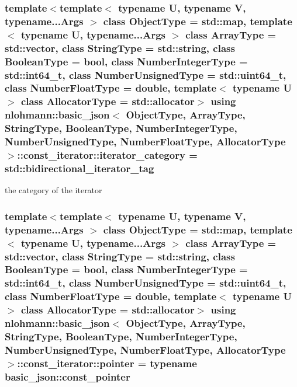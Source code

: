 \subsubsection[{\texorpdfstring{iterator\+\_\+category}{iterator_category}}]{\setlength{\rightskip}{0pt plus 5cm}template$<$template$<$ typename U, typename V, typename...\+Args $>$ class Object\+Type = std\+::map, template$<$ typename U, typename...\+Args $>$ class Array\+Type = std\+::vector, class String\+Type  = std\+::string, class Boolean\+Type  = bool, class Number\+Integer\+Type  = std\+::int64\+\_\+t, class Number\+Unsigned\+Type  = std\+::uint64\+\_\+t, class Number\+Float\+Type  = double, template$<$ typename U $>$ class Allocator\+Type = std\+::allocator$>$ using {\bf nlohmann\+::basic\+\_\+json}$<$ Object\+Type, Array\+Type, String\+Type, Boolean\+Type, Number\+Integer\+Type, Number\+Unsigned\+Type, Number\+Float\+Type, Allocator\+Type $>$\+::{\bf const\+\_\+iterator\+::iterator\+\_\+category} =  std\+::bidirectional\+\_\+iterator\+\_\+tag}\hypertarget{classnlohmann_1_1basic__json_1_1const__iterator_a821560d64f50525162097f19b1392e7f}{}\label{classnlohmann_1_1basic__json_1_1const__iterator_a821560d64f50525162097f19b1392e7f}


the category of the iterator 

\subsubsection[{\texorpdfstring{pointer}{pointer}}]{\setlength{\rightskip}{0pt plus 5cm}template$<$template$<$ typename U, typename V, typename...\+Args $>$ class Object\+Type = std\+::map, template$<$ typename U, typename...\+Args $>$ class Array\+Type = std\+::vector, class String\+Type  = std\+::string, class Boolean\+Type  = bool, class Number\+Integer\+Type  = std\+::int64\+\_\+t, class Number\+Unsigned\+Type  = std\+::uint64\+\_\+t, class Number\+Float\+Type  = double, template$<$ typename U $>$ class Allocator\+Type = std\+::allocator$>$ using {\bf nlohmann\+::basic\+\_\+json}$<$ Object\+Type, Array\+Type, String\+Type, Boolean\+Type, Number\+Integer\+Type, Number\+Unsigned\+Type, Number\+Float\+Type, Allocator\+Type $>$\+::{\bf const\+\_\+iterator\+::pointer} =  typename {\bf basic\+\_\+json\+::const\+\_\+pointer}}\hypertarget{classnlohmann_1_1basic__json_1_1const__iterator_a1da96fc3054d547e7706d3a2f073f389}{}\label{classnlohmann_1_1basic__json_1_1const__iterator_a1da96fc3054d547e7706d3a2f073f389}


